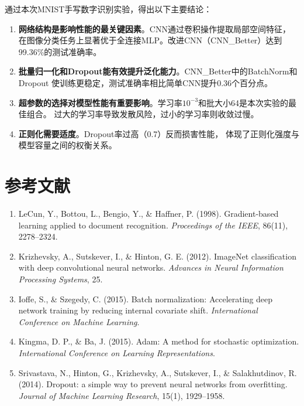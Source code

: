 \documentclass[12pt,a4paper]{article}
\begin{document}
通过本次MNIST手写数字识别实验，得出以下主要结论：

\begin{enumerate}
    \item \textbf{网络结构是影响性能的最关键因素}。CNN通过卷积操作提取局部空间特征，
          在图像分类任务上显著优于全连接MLP。改进CNN（CNN\_Better）达到99.36\%的测试准确率。
    
    \item \textbf{批量归一化和Dropout能有效提升泛化能力}。CNN\_Better中的BatchNorm和Dropout
          使训练更稳定，测试准确率相比简单CNN提升0.36个百分点。
    
    \item \textbf{超参数的选择对模型性能有重要影响}。学习率$10^{-3}$和批大小64是本次实验的最佳组合。
          过大的学习率导致发散风险，过小的学习率则收敛过慢。
    
    \item \textbf{正则化需要适度}。Dropout率过高（0.7）反而损害性能，
          体现了正则化强度与模型容量之间的权衡关系。
\end{enumerate}

\section{参考文献}

\begin{enumerate}
    \item LeCun, Y., Bottou, L., Bengio, Y., \& Haffner, P. (1998). Gradient-based learning applied to document recognition. \textit{Proceedings of the IEEE}, 86(11), 2278--2324.
    \item Krizhevsky, A., Sutskever, I., \& Hinton, G. E. (2012). ImageNet classification with deep convolutional neural networks. \textit{Advances in Neural Information Processing Systems}, 25.
    \item Ioffe, S., \& Szegedy, C. (2015). Batch normalization: Accelerating deep network training by reducing internal covariate shift. \textit{International Conference on Machine Learning}.
    \item Kingma, D. P., \& Ba, J. (2015). Adam: A method for stochastic optimization. \textit{International Conference on Learning Representations}.
    \item Srivastava, N., Hinton, G., Krizhevsky, A., Sutskever, I., \& Salakhutdinov, R. (2014). Dropout: a simple way to prevent neural networks from overfitting. \textit{Journal of Machine Learning Research}, 15(1), 1929--1958.
\end{enumerate}
\end{document}
